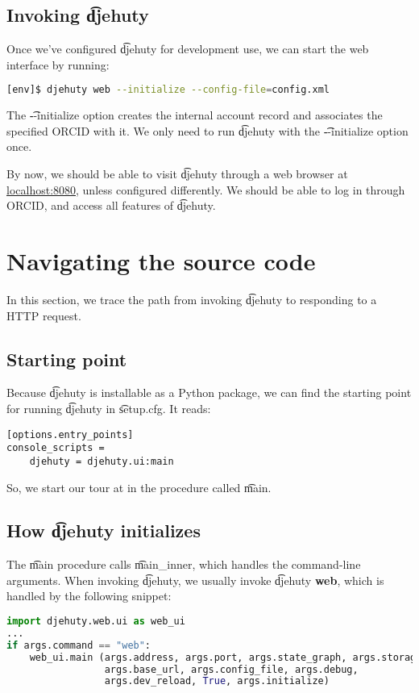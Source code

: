 \subsection{Invoking \t{djehuty}}

Once we've configured \t{djehuty} for development use, we can start the web
interface by running:

\begin{lstlisting}[language=bash]
[env]$ djehuty web --initialize --config-file=config.xml
\end{lstlisting}

The \t{-{}-initialize} option creates the internal account record and
associates the specified ORCID with it.  We only need to run \t{djehuty}
with the \t{-{}-initialize} option once.

By now, we should be able to visit \t{djehuty} through a web browser at
\href{http://127.0.0.1:8080}{localhost:8080}, unless configured differently.
We should be able to log in through ORCID, and access all features of
\t{djehuty}.

\section{Navigating the source code}

In this section, we trace the path from invoking \t{djehuty} to responding
to a HTTP request.

\subsection{Starting point}
Because \t{djehuty} is installable as a Python package, we can find the
starting point for running \t{djehuty} in \t{setup.cfg}.  It reads:
\begin{lstlisting}
[options.entry_points]
console_scripts =
    djehuty = djehuty.ui:main
\end{lstlisting}

So, we start our tour at  in the procedure called \t{main}.

\subsection{How \t{djehuty} initializes}

The \t{main} procedure calls \t{main\_inner}, which handles the command-line
arguments.  When invoking \t{djehuty}, we usually invoke
\t{djehuty \textbf{web}}, which is handled by the following snippet:
\begin{lstlisting}[language=python]
import djehuty.web.ui as web_ui
...
if args.command == "web":
    web_ui.main (args.address, args.port, args.state_graph, args.storage,
                 args.base_url, args.config_file, args.debug,
                 args.dev_reload, True, args.initialize)
\end{lstlisting}

